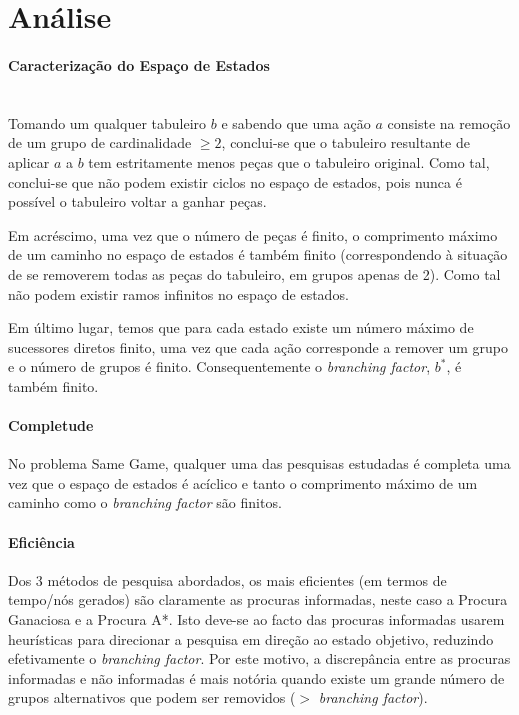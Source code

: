 \documentclass[a4paper]{article}
\begin{document}
    \section{Análise}
    \paragraph{Caracterização do Espaço de Estados}\mbox{} \\
    Tomando um qualquer tabuleiro $b$ e sabendo que uma ação $a$ consiste na remoção de um grupo de cardinalidade $\geq 2$,
    conclui-se que o tabuleiro resultante de aplicar $a$ a $b$ tem estritamente menos peças que o tabuleiro original. Como tal,
    conclui-se que não podem existir ciclos no espaço de estados, pois nunca é possível o tabuleiro voltar a ganhar peças.

    Em acréscimo, uma vez que o número de peças é finito, o comprimento máximo de um caminho no espaço de estados é também finito
    (correspondendo à situação de se removerem todas as peças do tabuleiro, em grupos apenas de 2). Como tal não podem existir
    ramos infinitos no espaço de estados.

    Em último lugar, temos que para cada estado existe um número máximo de sucessores diretos finito, uma vez que cada ação corresponde a
    remover um grupo e o número de grupos é finito. Consequentemente o \textit{branching factor}, $b^*$, é também finito.



    \paragraph{Completude}
    No problema Same Game, qualquer uma das pesquisas estudadas é completa uma vez que o espaço de estados é acíclico e tanto o
    comprimento máximo de um caminho como o \textit{branching factor} são finitos.


    \paragraph{Eficiência}
    Dos 3 métodos de pesquisa abordados, os mais eficientes (em termos de tempo/nós gerados) são claramente as procuras informadas,
    neste caso a Procura Ganaciosa e a Procura A*. Isto deve-se ao facto das procuras informadas usarem heurísticas para direcionar
    a pesquisa em direção ao estado objetivo, reduzindo efetivamente o \textit{branching factor}.
    Por este motivo, a discrepância entre as procuras informadas e não informadas é mais notória quando existe um grande número
    de grupos alternativos que podem ser removidos ($>$ \textit{branching factor}).
\end{document}
